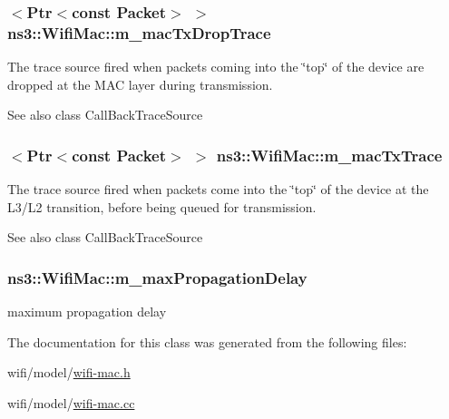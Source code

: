 \subsubsection[{\texorpdfstring{m\+\_\+mac\+Tx\+Drop\+Trace}{m_macTxDropTrace}}]{$<${\bf Ptr}$<$const {\bf Packet}$>$ $>$ ns3\+::\+Wifi\+Mac\+::m\+\_\+mac\+Tx\+Drop\+Trace\hspace{0.3cm}{\ttfamily [private]}}\hypertarget{classns3_1_1WifiMac_a8d28777a4c6f2a8c7514f0c6f93da79e}{}\label{classns3_1_1WifiMac_a8d28777a4c6f2a8c7514f0c6f93da79e}
The trace source fired when packets coming into the \char`\"{}top\char`\"{} of the device are dropped at the M\+AC layer during transmission.

\begin{DoxySeeAlso}{See also}
class Call\+Back\+Trace\+Source 
\end{DoxySeeAlso}
\subsubsection[{\texorpdfstring{m\+\_\+mac\+Tx\+Trace}{m_macTxTrace}}]{$<${\bf Ptr}$<$const {\bf Packet}$>$ $>$ ns3\+::\+Wifi\+Mac\+::m\+\_\+mac\+Tx\+Trace\hspace{0.3cm}{\ttfamily [private]}}\hypertarget{classns3_1_1WifiMac_a57a7609a3453d7f8bb45990edca1811e}{}\label{classns3_1_1WifiMac_a57a7609a3453d7f8bb45990edca1811e}
The trace source fired when packets come into the \char`\"{}top\char`\"{} of the device at the L3/\+L2 transition, before being queued for transmission.

\begin{DoxySeeAlso}{See also}
class Call\+Back\+Trace\+Source 
\end{DoxySeeAlso}
\subsubsection[{\texorpdfstring{m\+\_\+max\+Propagation\+Delay}{m_maxPropagationDelay}}]{ ns3\+::\+Wifi\+Mac\+::m\+\_\+max\+Propagation\+Delay\hspace{0.3cm}{\ttfamily [private]}}\hypertarget{classns3_1_1WifiMac_a2f809d4b50f8a46eed67c464ac7a930d}{}\label{classns3_1_1WifiMac_a2f809d4b50f8a46eed67c464ac7a930d}


maximum propagation delay 



The documentation for this class was generated from the following files\+:\begin{DoxyCompactItemize}
\item 
wifi/model/\hyperlink{wifi-mac_8h}{wifi-\/mac.\+h}\item 
wifi/model/\hyperlink{wifi-mac_8cc}{wifi-\/mac.\+cc}\end{DoxyCompactItemize}
